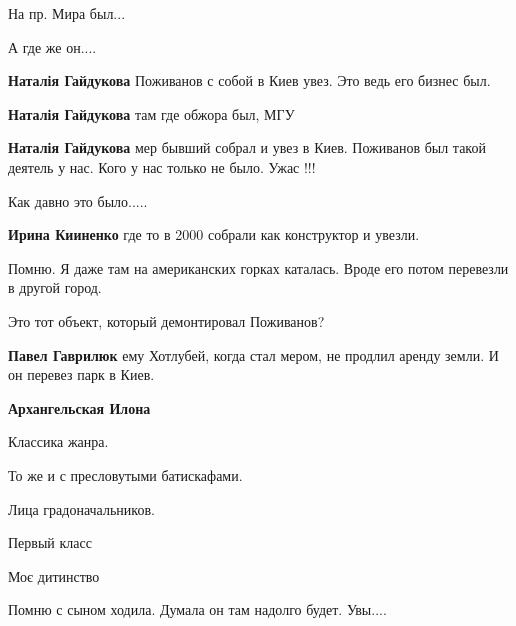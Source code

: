  
 
 
 
 

\qqSecCmt


На пр. Мира был...


А где же он....

\begin{itemize} %
\textbf{Наталія Гайдукова} Поживанов с собой в Киев увез. Это ведь его бизнес был.

\textbf{Наталія Гайдукова} там где обжора был, МГУ

\textbf{Наталія Гайдукова} мер бывший собрал и увез в Киев. Поживанов был такой деятель у нас. Кого у нас только не было. Ужас !!!
\end{itemize} %


Как давно это было.....

\textbf{Ирина Кииненко} где то в 2000 собрали как конструктор и увезли.


Помню. Я даже там на американских горках каталась. Вроде его потом перевезли в другой город.


Это тот объект, который демонтировал Поживанов?

\begin{itemize} %
\textbf{Павел Гаврилюк} ему Хотлубей, когда стал мером, не продлил аренду земли. И он перевез парк в Киев.

\textbf{Архангельская Илона}

Классика жанра.

То же и с пресловутыми батискафами.

Лица градоначальников.
\end{itemize} %


Первый класс🙂


Моє дитинство


Помню с сыном ходила. Думала он там надолго будет. Увы....
